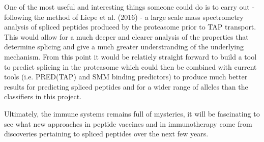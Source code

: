 \documentclass[10pt,a4paper,twoside,twocolumn]{article}
\begin{document}
One of the most useful and interesting things someone could do is to carry out - following the method of Liepe et al. (2016) -  a large scale mass spectrometry analysis of spliced peptides produced by the proteasome prior to TAP transport. This would allow for a much deeper and clearer analysis of the properties that determine splicing and give a much greater understranding of the underlying mechanism. From this point it would be relatiely straight forward to build a tool to predict splicing in the proteasome which could then be combined with current tools (i.e. PRED(TAP) and SMM binding predictors) to produce much better results for predicting spliced peptides and for a wider range of alleles than the classifiers in this project.

Ultimately, the immune systems remains full of mysteries, it will be fascinating to see what new approaches in peptide vaccines and in immunotherapy come from discoveries pertaining to spliced peptides over the next few years.


\end{document}
